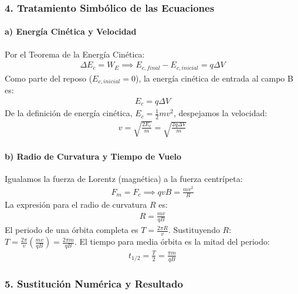 \subsubsection*{4. Tratamiento Simbólico de las Ecuaciones}
\paragraph*{a) Energía Cinética y Velocidad}
Por el Teorema de la Energía Cinética:
\begin{gather}
    \Delta E_c = W_E \implies E_{c,final} - E_{c,inicial} = q \Delta V
\end{gather}
Como parte del reposo ($E_{c,inicial}=0$), la energía cinética de entrada al campo B es:
\begin{gather}
    E_c = q \Delta V
\end{gather}
De la definición de energía cinética, $E_c = \frac{1}{2} m v^2$, despejamos la velocidad:
\begin{gather}
    v = \sqrt{\frac{2 E_c}{m}} = \sqrt{\frac{2 q \Delta V}{m}}
\end{gather}
\paragraph*{b) Radio de Curvatura y Tiempo de Vuelo}
Igualamos la fuerza de Lorentz (magnética) a la fuerza centrípeta:
\begin{gather}
    F_m = F_c \implies q v B = \frac{m v^2}{R}
\end{gather}
La expresión para el radio de curvatura $R$ es:
\begin{gather}
    R = \frac{m v}{q B}
\end{gather}
El periodo de una órbita completa es $T = \frac{2\pi R}{v}$. Sustituyendo $R$: $T = \frac{2\pi}{v}\left(\frac{m v}{q B}\right) = \frac{2\pi m}{q B}$.
El tiempo para media órbita es la mitad del periodo:
\begin{gather}
    t_{1/2} = \frac{T}{2} = \frac{\pi m}{q B}
\end{gather}

\subsubsection*{5. Sustitución Numérica y Resultado}
